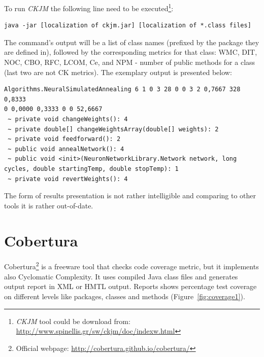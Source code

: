 To run \textit{CKJM} the following line need to be executed\footnote{\textit{CKJM} tool could be download from: \url{http://www.spinellis.gr/sw/ckjm/doc/indexw.html}}:

\begin{verbatim} 
java -jar [localization of ckjm.jar] [localization of *.class files] 
\end{verbatim} 

The command's output will be a list of class names (prefixed by the package they are defined in), followed by the corresponding metrics for that class: \ac{WMC}, \ac{DIT}, \ac{NOC}, \ac{CBO}, \ac{RFC}, \ac{LCOM}, \ac{Ce}, and NPM - number of public methods for a class (last two are not \ac{CK metrics}). The exemplary output is presented below:

\begin{verbatim} 
Algorithms.NeuralSimulatedAnnealing 6 1 0 3 28 0 0 3 2 0,7667 328 0,8333 
0 0,0000 0,3333 0 0 52,6667
 ~ private void changeWeights(): 4
 ~ private double[] changeWeightsArray(double[] weights): 2
 ~ private void feedforward(): 2
 ~ public void annealNetwork(): 4
 ~ public void <init>(NeuronNetworkLibrary.Network network, long cycles, double startingTemp, double stopTemp): 1
 ~ private void revertWeights(): 4
\end{verbatim} 

The form of results presentation is not rather intelligible and comparing to other tools it is rather out-of-date.  


\section{Cobertura}
Cobertura\footnote{Official webpage: \url{http://cobertura.github.io/cobertura/}} is a freeware tool that checks code coverage metric, but it implements also Cyclomatic Complexity.  It uses compiled Java class files and generates output report in XML or HMTL output. Reports shows percentage test coverage on different levels like packages, classes and methods (Figure~\ref{fig:coverage1}). 

